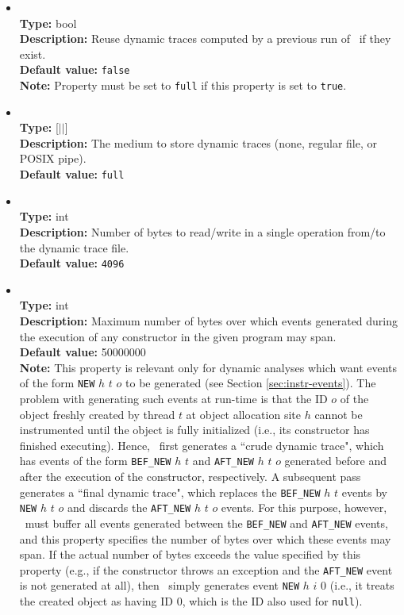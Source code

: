 \begin{itemize}
\item
{} \\
{\bf Type:} bool \\
{\bf Description:} Reuse dynamic traces computed by a previous run of \Chord\ if they exist. \\
{\bf Default value:} {\tt false} \\
{\bf Note:} Property  must be set to {\tt full} if this property is set to {\tt true}.

\item
{} \\
{\bf Type:} [$|$$|$] \\
{\bf Description:} The medium to store dynamic traces (none, regular file, or POSIX pipe). \\
{\bf Default value:} {\tt full} 

\item
{} \\
{\bf Type:} int \\
{\bf Description:} Number of bytes to read/write in a single operation from/to the dynamic trace file. \\
{\bf Default value:} {\tt 4096} 

\item
{} \\
{\bf Type:} int \\
{\bf Description:} Maximum number of bytes over which events generated during the execution of any constructor in the given program may span. \\
{\bf Default value:} 50000000 \\
{\bf Note:} This property is relevant only for dynamic analyses which want events of the form {\tt NEW} $h$ $t$ $o$ to be generated (see Section \ref{sec:instr-events}).  The problem with generating such events at run-time is that the ID $o$ of the object freshly created by thread $t$ at object allocation site $h$ cannot be instrumented until the object is fully initialized (i.e., its constructor has finished executing).  Hence, \Chord\ first generates a ``crude dynamic trace", which has events of the form {\tt BEF\_NEW} $h$ $t$ and {\tt AFT\_NEW} $h$ $t$ $o$ generated before and after the execution of the constructor, respectively.  A subsequent pass generates a ``final dynamic trace", which replaces the {\tt BEF\_NEW} $h$ $t$ events by {\tt NEW} $h$ $t$ $o$ and discards the {\tt AFT\_NEW} $h$ $t$ $o$ events.  For this purpose, however, \Chord\ must buffer all events generated between the {\tt BEF\_NEW} and {\tt AFT\_NEW} events, and this property specifies the number of bytes over which these events may span.  If the actual number of bytes exceeds the value specified by this property (e.g., if the constructor throws an exception and the {\tt AFT\_NEW} event is not generated at all), then \Chord\ simply generates event {\tt NEW} $h$ $i$ $0$ (i.e., it treats the created object as having ID 0, which is the ID also used for {\tt null}).


\end{itemize}
